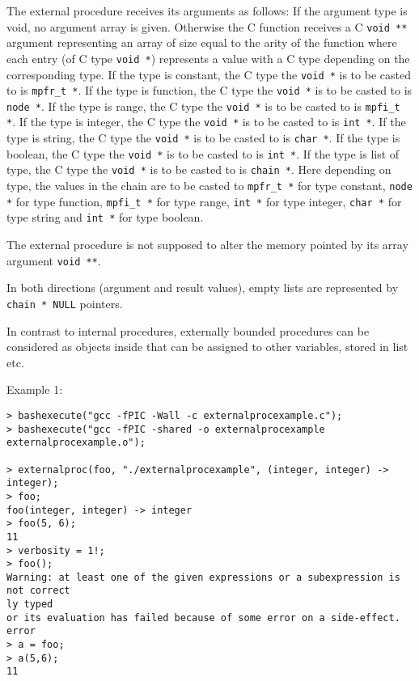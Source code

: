 \begin{itemize}
   The external procedure receives its arguments as follows: If the
   \sollya argument type is void, no argument array is given.  Otherwise
   the C function receives a C \texttt{void **} argument representing an array of
   size equal to the arity of the function where each entry (of C type
   \texttt{void *}) represents a value with a C type depending on the
   corresponding \sollya type. If the \sollya type is constant, the C
   type the \texttt{void *} is to be casted to is \texttt{mpfr\_t *}.  If the \sollya type
   is function, the C type the \texttt{void *} is to be casted to is \texttt{node *}.  If
   the \sollya type is range, the C type the \texttt{void *} is to be casted to is
   \texttt{mpfi\_t *}.  If the \sollya type is integer, the C type the \texttt{void *} is to
   be casted to is \texttt{int *}.  If the \sollya type is string, the C type the
   \texttt{void *} is to be casted to is \texttt{char *}.  If the \sollya type is boolean,
   the C type the \texttt{void *} is to be casted to is \texttt{int *}.  If the \sollya
   type is list of type, the C type the \texttt{void *} is to be casted to is
   \texttt{chain *}.  Here depending on type, the values in the chain are to be
   casted to \texttt{mpfr\_t *}  for \sollya type constant, \texttt{node *} for \sollya type
   function, \texttt{mpfi\_t *} for \sollya type range, \texttt{int *} for \sollya type
   integer, \texttt{char *} for \sollya type string and \texttt{int *} for \sollya type
   boolean.
    
   The external procedure is not supposed to alter the memory pointed by
   its array argument \texttt{void **}.
    
   In both directions (argument and result values), empty lists are
   represented by \texttt{chain * NULL} pointers.
    
   In contrast to internal procedures, externally bounded procedures can
   be considered as objects inside \sollya that can be assigned to other
   variables, stored in list etc.
\end{itemize}
\noindent Example 1: 
\begin{center}\begin{minipage}{15cm}\begin{Verbatim}[frame=single]
> bashexecute("gcc -fPIC -Wall -c externalprocexample.c");
> bashexecute("gcc -fPIC -shared -o externalprocexample externalprocexample.o");

> externalproc(foo, "./externalprocexample", (integer, integer) -> integer);
> foo;
foo(integer, integer) -> integer
> foo(5, 6);
11
> verbosity = 1!;
> foo();
Warning: at least one of the given expressions or a subexpression is not correct
ly typed
or its evaluation has failed because of some error on a side-effect.
error
> a = foo;
> a(5,6);
11
\end{Verbatim}
\end{minipage}\end{center}
